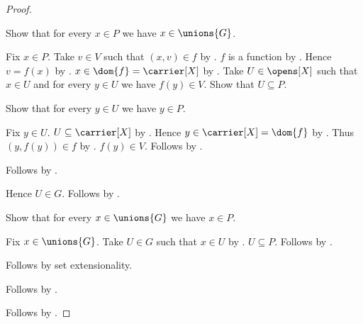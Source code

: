 \begin{proof}
\begin{subproof}
\begin{subproof}
\begin{subproof}
                Show that for every $x\in P$ we have $x\in\unions{G}$.
                \begin{subproof}
                    Fix $x\in P$.
                    Take $v\in V$ such that $(x,v)\in f$
                        by .
                    $f$ is a function by .
                    Hence $v=f(x)$
                        by .
                    $x\in\dom{f}=\carrier[X]$
                        by .
                    Take $U\in\opens[X]$ such that $x\in U$ and
                        for every $y\in U$ we have $f(y)\in V$.
                    Show that $U\subseteq P$.
                    \begin{subproof}
                        Show that for every $y\in U$ we have $y\in P$.
                        \begin{subproof}
                            Fix $y\in U$.
                            $U\subseteq\carrier[X]$
                                by .
                            Hence $y\in\carrier[X]=\dom{f}$
                                by .
                            Thus $(y,f(y))\in f$
                                by .
                            $f(y)\in V$.
                            Follows by .
                        \end{subproof}
                        Follows by .
                    \end{subproof}
                    Hence $U\in G$.
                    Follows by .
                \end{subproof}
                Show that for every $x\in\unions{G}$ we have $x\in P$.
                \begin{subproof}
                    Fix $x\in\unions{G}$.
                    Take $U\in G$ such that $x\in U$
                        by .
                    $U\subseteq P$.
                    Follows by .
                \end{subproof}
                Follows by set extensionality.
            \end{subproof}
        \end{subproof}
        Follows by .
    \end{subproof}
    Follows by \auto.
\end{proof}

